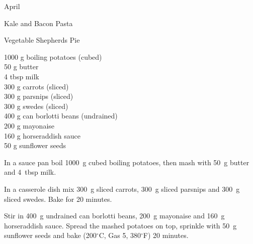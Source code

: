 \begin{menu}{April}
\begin{recipe}{2}{Kale and Bacon Pasta}
\begin{instructions}
    \end{instructions}
    \end{recipe}%
  
    \begin{recipe}{2}{Vegetable Shepherds Pie}%
		\begin{ingredients}
		1000 g boiling potatoes (cubed) \\
	50 g butter  \\
	4 tbsp milk  \\
	300 g carrots (sliced) \\
	300 g parsnips (sliced) \\
	300 g swedes (sliced) \\
	400 g can borlotti beans (undrained) \\
	200 g mayonaise  \\
	160 g horseraddish sauce  \\
	50 g sunflower seeds  \\
	
		\end{ingredients}
	
	
	
    \begin{instructions}
    \item 
        In a sauce pan boil
        1000~g cubed boiling potatoes,
        then mash with
        50~g  butter
        and
        4~tbsp  milk.
      \item 
        In a casserole dish mix
        300~g sliced carrots,
        300~g sliced parsnips and
        300~g sliced swedes.
        Bake for 20 minutes.
      \item 
        Stir in
        400~g undrained can borlotti beans,
        200~g  mayonaise
        and
        160~g  horseraddish sauce.
        Spread the mashed potatoes on top,
        sprinkle with
        50~g  sunflower seeds
        and
        bake (200$^{\circ}$C, Gas 5, 380$^{\circ}$F) 20 minutes.
      
    \end{instructions}
    \end{recipe}%
  

\end{menu}
